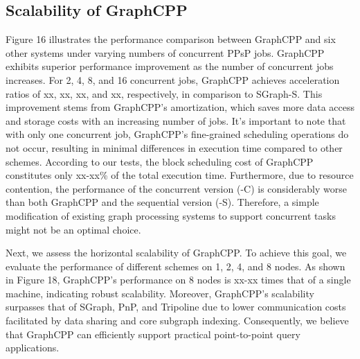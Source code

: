 \documentclass[lettersize,journal]{IEEEtran} %
\begin{document}
\subsection{Scalability of GraphCPP}
Figure 16 illustrates the performance comparison between GraphCPP and six other systems under varying numbers of concurrent PPsP jobs. GraphCPP exhibits superior performance improvement as the number of concurrent jobs increases. For 2, 4, 8, and 16 concurrent jobs, GraphCPP achieves acceleration ratios of xx, xx, xx, and xx, respectively, in comparison to SGraph-S. This improvement stems from GraphCPP's amortization, which saves more data access and storage costs with an increasing number of jobs. It's important to note that with only one concurrent job, GraphCPP's fine-grained scheduling operations do not occur, resulting in minimal differences in execution time compared to other schemes. According to our tests, the block scheduling cost of GraphCPP constitutes only xx-xx\% of the total execution time. Furthermore, due to resource contention, the performance of the concurrent version (-C) is considerably worse than both GraphCPP and the sequential version (-S). Therefore, a simple modification of existing graph processing systems to support concurrent tasks might not be an optimal choice.

Next, we assess the horizontal scalability of GraphCPP. To achieve this goal, we evaluate the performance of different schemes on 1, 2, 4, and 8 nodes. As shown in Figure 18, GraphCPP's performance on 8 nodes is xx-xx times that of a single machine, indicating robust scalability. Moreover, GraphCPP's scalability surpasses that of SGraph, PnP, and Tripoline due to lower communication costs facilitated by data sharing and core subgraph indexing. Consequently, we believe that GraphCPP can efficiently support practical point-to-point query applications.
\end{document}
